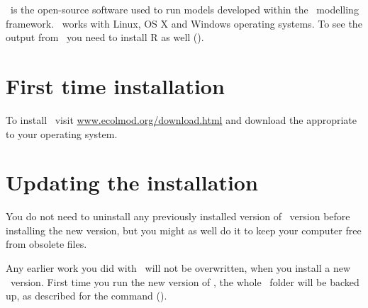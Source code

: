 \US\ is the open-source software used to run models developed within the \US\ modelling framework. \US\ works with Linux, OS X and Windows operating systems.
To see the output from \US\ you need to install R as well ().

\section{First time installation}
To install \US\ visit \url{www.ecolmod.org/download.html} and download the  appropriate to your operating system. 

\section{Updating the installation}
You do not need to uninstall any previously installed version of \US\ version before installing the new version, but you might as well do it to keep your computer free from obsolete files. 

Any earlier work you did with \US\ will not be overwritten, when you install a new \US\ version. First time you run the new version of \US, the whole \ushomeexplained\ folder will be backed up, as described for the  command ().

